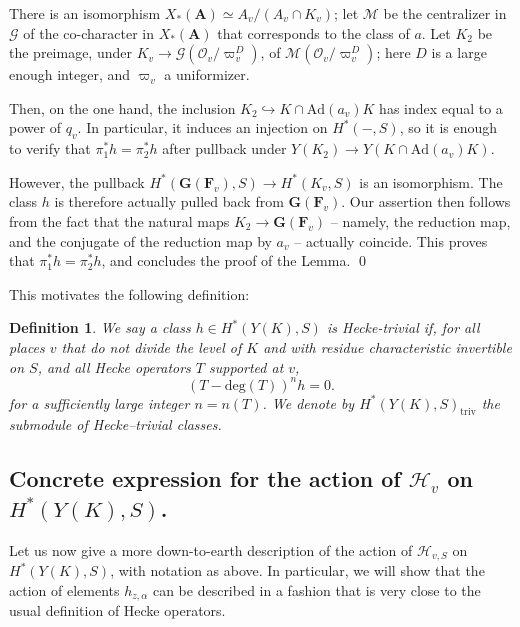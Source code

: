 \documentclass[10pt]{amsart}
\newcommand{\Ad}{\mathrm{Ad}}
\newcommand{\triv}{\mathrm{triv}}
\newtheorem{Definition}[subsection]{Definition}
\theoremstyle{remark}
\begin{document}
There is an isomorphism $X_*(\mathbf{A}) \simeq A_v/ (A_v \cap K_v)$;
let $\mathcal{M}$ be the centralizer  in $\mathcal{G}$ of the co-character in $X_*(\mathbf{A})$
that corresponds to the class of $a$. 
Let $K_2$ be the preimage, under $K_v \rightarrow \mathcal{G}(\mathcal{O}_v/\varpi_v^D )$,
of $\mathcal{M}(\mathcal{O}_v/\varpi_v^D)$; here $D$ is a large enough  integer, and $\varpi_v$ a uniformizer. 
 

Then, on the one hand, the inclusion $K_2 \hookrightarrow K \cap \Ad(a_v) K$ has  index
equal to a power of $q_v$. In particular, it induces an injection on $H^*(-, S)$, so it is enough 
to verify that $\pi_1^* h = \pi_2^* h$ after pullback under $Y(K_2) \rightarrow Y(K \cap \Ad(a_v) K)$. 

However,  the pullback $H^*(\mathbf{G}(\mathbf{F}_v), S) \rightarrow H^*(K_v, S)$ is an isomorphism. 
The class $h$ is therefore actually pulled back from $\mathbf{G}(\mathbf{F}_v)$. Our assertion then follows from the fact that 
the
 natural maps
$K_2 \longrightarrow  \mathbf{G}(\mathbf{F}_v)$ -- namely, the reduction map, 
and the conjugate of the reduction map by $a_v$ --  actually  coincide. 
 This proves that $\pi_1^* h = \pi_2^* h$, and concludes the proof of the Lemma. 
 \qed
 

 
 This motivates the following definition:  
 
 \begin{Definition}  \label{HTriv}
 We say a class 
$ h \in H^*(Y(K), S)$ is {\em Hecke-trivial} if,
for all places $v$ that do not divide the level of $K$ and  with residue characteristic invertible on $S$, 
 and all Hecke operators $T$  supported at $v$,
$$(T - \mathrm{deg}(T))^{n} h = 0.$$ 
for a sufficiently large integer $n=n(T)$. 
We denote by $H^*(Y(K), S)_{\triv}$ the submodule of Hecke--trivial classes.    \end{Definition}
  
  
 
 

\subsection{Concrete expression for the action of $\mathscr{H}_v$ on $H^*(Y(K), S)$.}\label{sec:concrete}

Let us now give a more down-to-earth description of the action of $\mathscr{H}_{v,S}$ on $H^*(Y(K), S)$, with notation as above.
In particular, we will show that the action of elements $h_{z,\alpha}$ can be described in a fashion that is very close to the usual definition of Hecke operators. 
\end{document}

